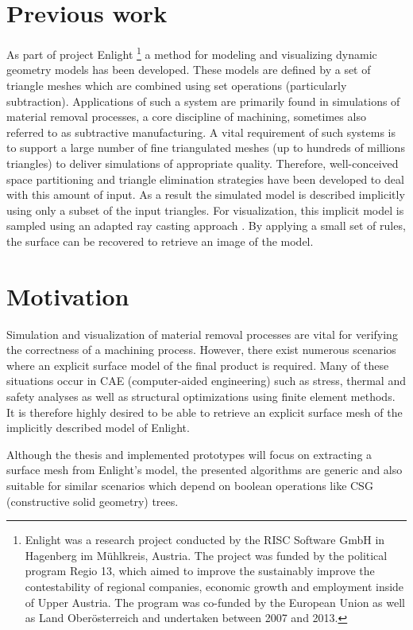 

\section{Previous work}

As part of project Enlight
\footnote{
	Enlight was a research project conducted by the RISC Software GmbH in Hagenberg im M\"uhlkreis, Austria. The project was funded by the political program Regio 13, which aimed to improve the sustainably improve the contestability of regional companies, economic growth and employment inside of Upper Austria. The program was co-funded by the European Union as well as Land Ober\"osterreich and undertaken between 2007 and 2013.
}
a method for modeling and visualizing dynamic geometry models has been developed. These models are defined by a set of triangle meshes which are combined using set operations (particularly subtraction). Applications of such a system are primarily found in simulations of material removal processes, a core discipline of machining, sometimes also referred to as subtractive manufacturing. A vital requirement of such systems is to support a large number of fine triangulated meshes (up to hundreds of millions triangles) to deliver simulations of appropriate quality. Therefore, well-conceived space partitioning and triangle elimination strategies have been developed to deal with this amount of input. As a result the simulated model is described implicitly using only a subset of the input triangles. For visualization, this implicit model is sampled using an adapted ray casting approach \cite{enlight}. By applying a small set of rules, the surface can be recovered to retrieve an image of the model.


\section{Motivation}

Simulation and visualization of material removal processes are vital for verifying the correctness of a machining process. However, there exist numerous scenarios where an explicit surface model of the final product is required. Many of these situations occur in CAE (computer-aided engineering) such as stress, thermal and safety analyses as well as structural optimizations using finite element methods. It is therefore highly desired to be able to retrieve an explicit surface mesh of the implicitly described model of Enlight.

Although the thesis and implemented prototypes will focus on extracting a surface mesh from Enlight's model, the presented algorithms are generic and also suitable for similar scenarios which depend on boolean operations like CSG (constructive solid geometry) trees.

